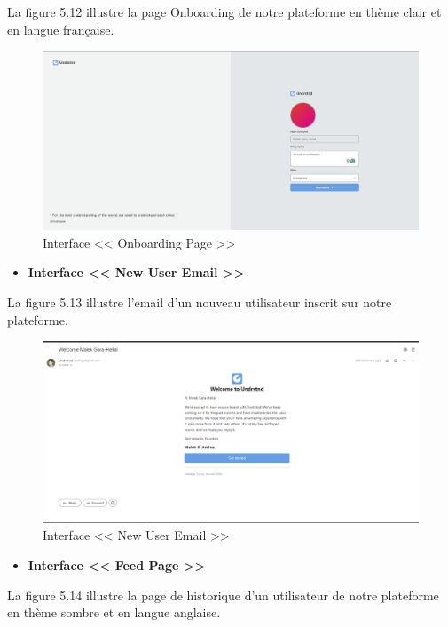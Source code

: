 La figure 5.12 illustre la page Onboarding de notre plateforme en thème clair et en langue française.
\begin{figure}[H]
    \centering
    \includegraphics[width=1.1\textwidth,height=0.5\textwidth]{images/chp5/fig12.png}
    \caption{Interface << Onboarding Page >>}
    \label{Interface << Onboarding Page >>}    
\end{figure}
\begin{itemize}
    \item \textbf{Interface << New User Email >>}
\end{itemize}
La figure 5.13 illustre l'email d'un nouveau utilisateur inscrit sur notre plateforme.
\begin{figure}[H]
    \centering
    \includegraphics[width=1.1\textwidth,height=0.5\textwidth]{images/chp5/fig13.png}
    \caption{Interface << New User Email >>}
    \label{Interface << New User Email >>}    
\end{figure}
\begin{itemize}
    \item \textbf{Interface << Feed Page >>}
\end{itemize}
La figure 5.14 illustre la page de historique d'un utilisateur de notre plateforme en thème sombre et en langue anglaise.
